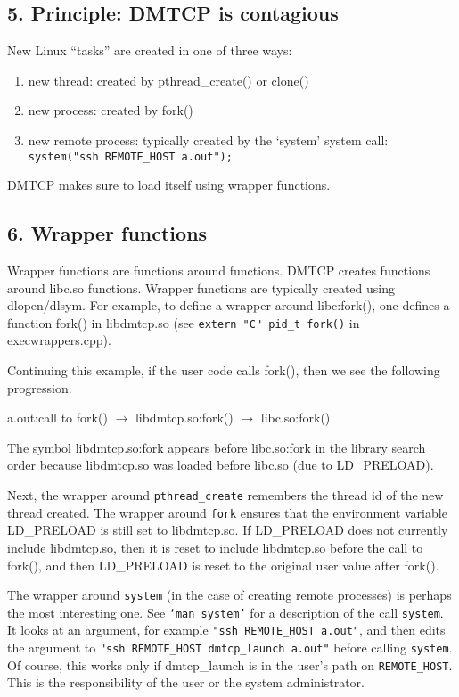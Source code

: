 \documentclass{article}
\begin{document}
\newpage

\subsection*{5. Principle:  DMTCP is contagious}

New Linux ``tasks'' are created in one of three ways:
\begin{enumerate}
  \item new thread: created by pthread\_create() or clone()
  \item new process: created by fork()
  \item new remote process: typically created by the `system' system call: \\
	{\tt system("ssh REMOTE\_HOST a.out");}
\end{enumerate}

DMTCP makes sure to load itself using wrapper functions.

\subsection*{6. Wrapper functions}

Wrapper functions are functions around functions.  DMTCP creates
functions around libc.so functions.
Wrapper functions
are typically created using dlopen/dlsym.  For example, to define
a wrapper around libc:fork(), one defines a function fork()
in libdmtcp.so (see {\tt extern "C" pid\_t fork()} in execwrappers.cpp).

Continuing this example, if the user code calls fork(), then we see
the following progression.

a.out:call to fork() $\longrightarrow$ libdmtcp.so:fork() $\longrightarrow$ libc.so:fork()

The symbol libdmtcp.so:fork appears before libc.so:fork in the
library search order because libdmtcp.so was loaded before libc.so
(due to LD\_PRELOAD).

Next, the wrapper around {\tt pthread\_create} remembers the thread id
of the new thread created.  The wrapper around {\tt fork} ensures
that the environment variable LD\_PRELOAD is still set to libdmtcp.so.
If LD\_PRELOAD does not currently include libdmtcp.so, then it is
reset to include libdmtcp.so before the call to fork(), and then
LD\_PRELOAD is reset to the original user value after fork().

The wrapper around {\tt system} (in the case of creating remote processes)
is perhaps the most interesting one.  See {\tt `man system'} for a description
of the call {\tt system}.  It looks at an argument, for example
{\tt "ssh REMOTE\_HOST a.out"}, and then edits the argument to
{\tt "ssh REMOTE\_HOST dmtcp\_launch a.out"} before calling {\tt system}.
Of course, this works only if dmtcp\_launch is in the user's path
on {\tt REMOTE\_HOST}.  This is the responsibility of the user or the
system administrator.
\end{document}
